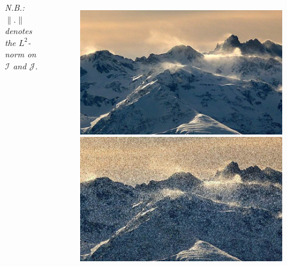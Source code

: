 \documentclass[10pt]{beamer}
\newcommand{\MI}{{\mathcal I}}
\newcommand{\MJ}{{\mathcal J}}
\begin{document}
\begin{darkframes}
\begin{frame}[label=noise]{\subsecname}
\begin{columns}
        \emph{N.B.: $\|.\|$ denotes the $L^2$-norm on $\MI$ and $\MJ$.} 
    
        
        \begin{figure}
        \centering
        \includegraphics[height=0.3\textheight]{resources/25639-9_1.jpg}
        \vspace{0.01\textheight}
        \includegraphics[height=0.3\textheight]{resources/25639-9_4.jpg}
        \end{figure}
        
    \end{columns}
    
    \end{frame}
    

\end{darkframes}
\end{document}
